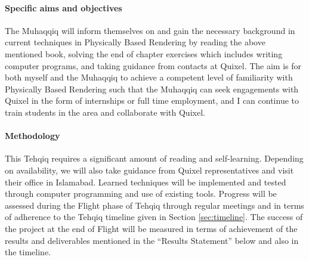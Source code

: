 \documentclass{article}
\begin{document}
\paragraph{Specific aims and objectives} The Muhaqqiq will inform themselves on and gain the necessary background in current techniques in Physically Based Rendering by reading the above mentioned book, solving the end of chapter exercises which includes writing computer programs, and taking guidance from contacts at Quixel. The aim is for both myself and the Muhaqqiq to achieve a competent level of familiarity with Physically Based Rendering such that the Muhaqqiq can seek engagements with Quixel in the form of internships or full time employment, and I can continue to train students in the area and collaborate with Quixel.
\paragraph{Methodology} This Tehqiq requires a significant amount of reading and self-learning. Depending on availability, we will also take guidance from Quixel representatives and visit their office in Islamabad. Learned techniques will be implemented and tested through computer programming and use of existing tools. Progress will be assessed during the Flight phase of Tehqiq through regular meetings and in terms of adherence to the Tehqiq timeline given in Section \ref{sec:timeline}. The success of the project at the end of Flight will be measured in terms of achievement of the results and deliverables mentioned in the ``Results Statement'' below and also in the timeline.
\end{document}
